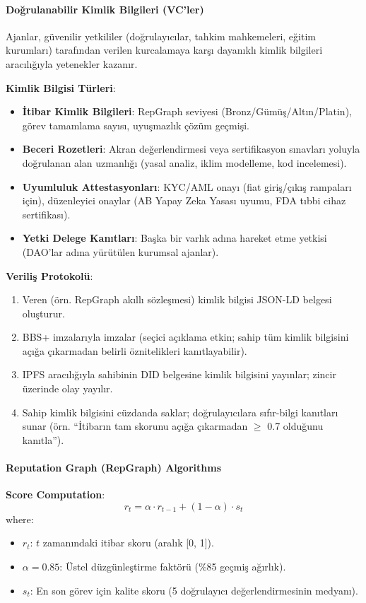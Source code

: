 \documentclass[11pt]{article}
\begin{document}
\paragraph{Doğrulanabilir Kimlik Bilgileri (VC'ler)}
Ajanlar, güvenilir yetkililer (doğrulayıcılar, tahkim mahkemeleri, eğitim kurumları) tarafından verilen kurcalamaya karşı dayanıklı kimlik bilgileri aracılığıyla yetenekler kazanır.

\textbf{Kimlik Bilgisi Türleri}:
\begin{itemize}[noitemsep]
  \item \textbf{İtibar Kimlik Bilgileri}: RepGraph seviyesi (Bronz/Gümüş/Altın/Platin), görev tamamlama sayısı, uyuşmazlık çözüm geçmişi.
  \item \textbf{Beceri Rozetleri}: Akran değerlendirmesi veya sertifikasyon sınavları yoluyla doğrulanan alan uzmanlığı (yasal analiz, iklim modelleme, kod incelemesi).
  \item \textbf{Uyumluluk Attestasyonları}: KYC/AML onayı (fiat giriş/çıkış rampaları için), düzenleyici onaylar (AB Yapay Zeka Yasası uyumu, FDA tıbbi cihaz sertifikası).
  \item \textbf{Yetki Delege Kanıtları}: Başka bir varlık adına hareket etme yetkisi (DAO'lar adına yürütülen kurumsal ajanlar).
\end{itemize}

\textbf{Veriliş Protokolü}:
\begin{enumerate}[noitemsep]
  \item Veren (örn. RepGraph akıllı sözleşmesi) kimlik bilgisi JSON-LD belgesi oluşturur.
  \item BBS+ imzalarıyla imzalar (seçici açıklama etkin; sahip tüm kimlik bilgisini açığa çıkarmadan belirli öznitelikleri kanıtlayabilir).
  \item IPFS aracılığıyla sahibinin DID belgesine kimlik bilgisini yayınlar; zincir üzerinde olay yayılır.
  \item Sahip kimlik bilgisini cüzdanda saklar; doğrulayıcılara sıfır-bilgi kanıtları sunar (örn. ``İtibarın tam skorunu açığa çıkarmadan $\geq$ 0.7 olduğunu kanıtla'').
\end{enumerate}

\paragraph{Reputation Graph (RepGraph) Algorithms}

\textbf{Score Computation}:
\begin{equation}
r_t = \alpha \cdot r_{t-1} + (1 - \alpha) \cdot s_t
\end{equation}
where:
\begin{itemize}[noitemsep]
  \item $r_t$: $t$ zamanındaki itibar skoru (aralık [0, 1]).
  \item $\alpha = 0.85$: Üstel düzgünleştirme faktörü (\%85 geçmiş ağırlık).
  \item $s_t$: En son görev için kalite skoru (5 doğrulayıcı değerlendirmesinin medyanı).
\end{itemize}
\end{document}
